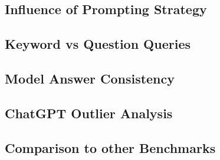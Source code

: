 \subsection{Influence of Prompting Strategy}


\subsection{Keyword vs Question Queries}

\subsection{Model Answer Consistency}

\subsection{ChatGPT Outlier Analysis}





\subsection{Comparison to other Benchmarks}